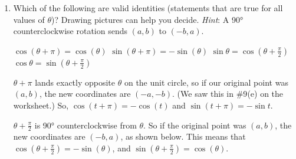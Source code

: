 \documentclass{article}
\begin{document}
\begin{enumerate}
\begin{enumerate}[topsep=0pt]
  \item 

    \begin{problem}
      Which of the following are valid identities (statements that are true for all values of $\theta$)?  Drawing pictures can help you decide. \emph{Hint}: A \ang{90} counterclockwise rotation sends $(a, b)$ to $(-b, a)$.
    \end{problem}
    \begin{enumerate}[label=\protect\maybecircle{\Alph*.}]
    \plainitem $\cos(\theta + \pi) = \cos(\theta)$
    \circleitem $\sin(\theta + \pi) = - \sin(\theta)$
    \plainitem $\displaystyle \sin \theta = \cos \left( \theta + \frac{\pi}{2}
      \right)$ 
    \circleitem $\displaystyle \cos \theta = \sin \left( \theta + \frac{\pi}{2}
      \right)$ 
    \end{enumerate}


    \begin{solution}
      $\theta+\pi$ lands exactly opposite $\theta$ on the unit circle, so if our original point was $(a,b)$, the new coordinates are $(-a, -b)$.  (We saw this in
        {{{{\#9}}(e)}} on the worksheet.)  So, $\cos(t + \pi) = - \cos(t)$ and $\sin(t +
      \pi) = - \sin t$.

      $\theta+\frac{\pi}{2}$ is \ang{90} counterclockwise from $\theta$. So if the original point was $(a,b)$, the new coordinates are $(-b, a)$, as shown below. This means that $\cos(\theta+\frac{\pi}{2})=-\sin(\theta)$, and $\sin(\theta+\frac{\pi}{2})=\cos(\theta)$.

\end{solution}
\end{enumerate}
\end{enumerate}
\end{document}

